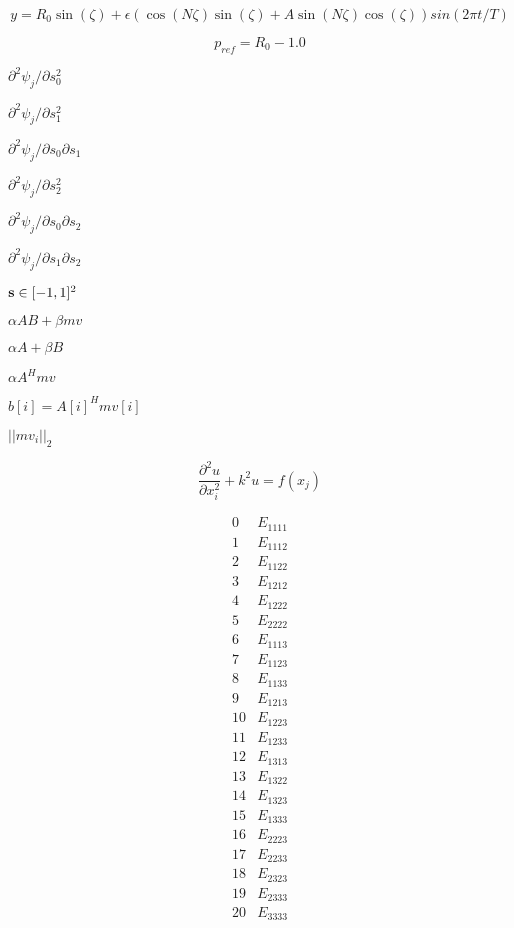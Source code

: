 \documentclass{article}
\begin{document}
\[ y = R_0 \sin(\zeta) + \epsilon \left( \cos(N \zeta) \sin(\zeta) + A \sin(N \zeta) \cos(\zeta) \right) sin(2 \pi t/T) \]
\pagebreak

\[ p_{ref} = R_0 - 1.0 \]
\pagebreak

$ \partial ^2 \psi_j / \partial s_0^2 $
\pagebreak

$ \partial ^2 \psi_j / \partial s_1^2 $
\pagebreak

$ \partial ^2 \psi_j / \partial s_0 \partial s_1 $
\pagebreak

$ \partial ^2 \psi_j / \partial s_2^2 $
\pagebreak

$ \partial ^2 \psi_j / \partial s_0 \partial s_2 $
\pagebreak

$ \partial ^2 \psi_j / \partial s_1 \partial s_2 $
\pagebreak

$ {\bf s} \in [-1,1]^2 $
\pagebreak

$ \alpha AB + \beta mv $
\pagebreak

$\alpha A + \beta B$
\pagebreak

$ \alpha A^Hmv $
\pagebreak

$b[i] = A[i]^Hmv[i]$
\pagebreak

$||mv_i||_2$
\pagebreak

\[ \frac{\partial^2 u}{\partial x_i^2} + k^2 u = f(x_j) \]
\pagebreak

\[\begin{array}{cc} 0 & E_{1111} \\ 1 & E_{1112} \\ 2 & E_{1122} \\ 3 & E_{1212} \\ 4 & E_{1222} \\ 5 & E_{2222} \\ 6 & E_{1113} \\ 7 & E_{1123} \\ 8 & E_{1133} \\ 9 & E_{1213} \\ 10 & E_{1223} \\ 11 & E_{1233} \\ 12 & E_{1313} \\ 13 & E_{1322} \\ 14 & E_{1323} \\ 15 & E_{1333} \\ 16 & E_{2223} \\ 17 & E_{2233} \\ 18 & E_{2323} \\ 19 & E_{2333} \\ 20 & E_{3333} \end{array}\]
\pagebreak
\end{document}
